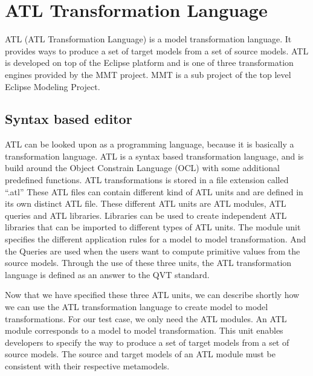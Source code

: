 \documentclass[pdftex,11pt,a4paper]{article}
\begin{document}
\section{ATL Transformation Language}

\noindent ATL\cite{ATL} (ATL Transformation Language) is a model transformation
language. It provides ways to produce a set of target models from a set of
source models. ATL is developed on top of the Eclipse platform and is one of
three transformation engines provided by the MMT project\cite{MMT}. MMT is a
sub project of the top level Eclipse Modeling Project\cite{EMP}. 

\subsection{Syntax based editor}

\noindent ATL can be looked upon as a programming language, because it is
basically a transformation language. ATL is a syntax based transformation
language, and is build around the Object Constrain Language (OCL) \cite{OCL}
with some additional predefined functions. ATL transformations is stored in a
file extension called ``.atl'' These ATL files can contain different kind of
ATL units and are defined in its own distinct ATL file. These different ATL
units are ATL modules, ATL queries and ATL libraries. Libraries can be used to
create independent ATL libraries that can be imported to different types of ATL
units. The module unit specifies the different application rules for a model to
model transformation. And the Queries are used when the users want to compute
primitive values from the source models. Through the use of these three units,
the ATL transformation language is defined as an answer to the QVT\cite{QVT}
standard.

Now that we have specified these three ATL units, we can describe shortly how
we can use the ATL transformation language to create model to model
transformations. For our test case, we only need the ATL modules. An ATL module
corresponds to a model to model transformation. This unit enables developers to
specify the way to produce a set of target models from a set of source models.
The source and target models of an ATL module must be consistent with their
respective metamodels. 
\end{document}
